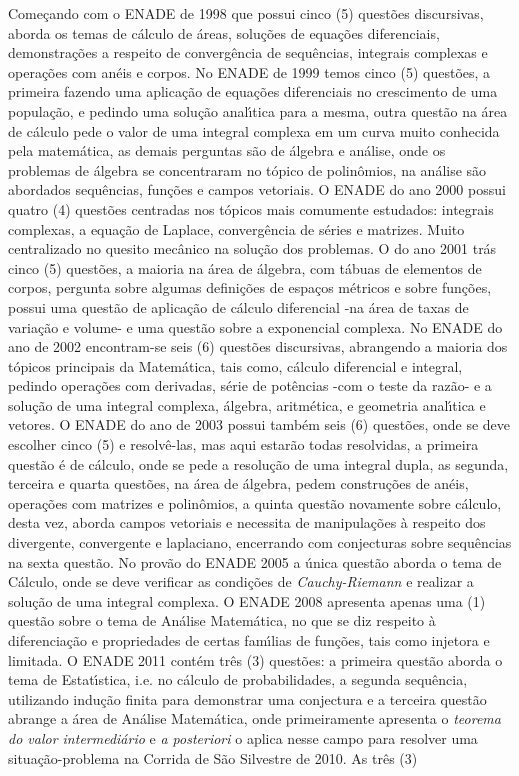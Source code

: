 \documentclass{report}
\begin{document}
Come\c cando com o ENADE de 1998 que possui cinco (5) quest\~oes discursivas, aborda os temas de c\'alculo de \'areas, solu\c c\~oes de equa\c c\~oes diferenciais, demonstra\c c\~oes a respeito de converg\^encia de sequ\^encias, integrais complexas e opera\c c\~oes com an\'eis e corpos. No ENADE de 1999 temos cinco (5) quest\~oes, a primeira fazendo uma aplica\c c\~ao de equa\c c\~oes diferenciais no crescimento de uma popula\c c\~ao, e pedindo uma solu\c c\~ao anal\'\i tica para a mesma, outra quest\~ao na \'area de c\'alculo pede o valor de uma integral complexa em um curva muito conhecida pela matem\'atica, as demais perguntas s\~ao de \'algebra e an\'alise, onde os problemas de \'algebra se concentraram no t\'opico de polinômios, na an\'alise s\~ao abordados sequ\^encias, fun\c c\~oes e campos vetoriais. O ENADE do ano 2000 possui quatro (4) quest\~oes centradas nos t\'opicos mais comumente estudados: integrais complexas, a equa\c c\~ao de Laplace, converg\^encia de s\'eries e matrizes. Muito centralizado no quesito mec\^anico na solu\c c\~ao dos problemas. O do ano 2001 tr\'as cinco (5) quest\~oes, a maioria na \'area de \'algebra, com t\'abuas de elementos de corpos, pergunta sobre algumas defini\c c\~oes de espa\c cos m\'etricos e sobre fun\c c\~oes, possui uma quest\~ao de aplica\c c\~ao de c\'alculo diferencial -na \'area de taxas de varia\c c\~ao e volume- e uma quest\~ao sobre a exponencial complexa. No ENADE do ano de 2002 encontram-se seis (6) quest\~oes discursivas, abrangendo a maioria dos t\'opicos principais da Matem\'atica, tais como, c\'alculo diferencial e integral, pedindo opera\c c\~oes com derivadas, s\'erie de pot\^encias -com o teste da raz\~ao- e a solu\c c\~ao de uma integral complexa, \'algebra, aritm\'etica, e geometria anal\'\i tica e vetores. O ENADE do ano de 2003 possui tamb\'em seis (6) quest\~oes, onde se deve escolher cinco (5) e resolv\^e-las, mas aqui estar\~ao todas resolvidas, a primeira quest\~ao \'e de c\'alculo, onde se pede a resolu\c c\~ao de uma integral dupla, as segunda, terceira e quarta quest\~oes, na \'area de \'algebra, pedem constru\c c\~oes de an\'eis, opera\c c\~oes com matrizes e polinômios, a quinta quest\~ao novamente sobre c\'alculo, desta vez, aborda campos vetoriais e necessita de manipula\c c\~oes \`a respeito dos divergente, convergente e laplaciano, encerrando com conjecturas sobre sequ\^encias na sexta quest\~ao. No prov\~ao do ENADE 2005 a \'unica quest\~ao aborda o tema de C\'alculo, onde se deve verificar as condi\c c\~oes de {\it Cauchy-Riemann} e realizar a solu\c c\~ao de uma integral complexa. O ENADE 2008 apresenta apenas uma (1) quest\~ao sobre o tema de An\'alise Matem\'atica, no que se diz respeito \`a diferencia\c c\~ao e propriedades de certas fam\'\i lias de fun\c c\~oes, tais como injetora e limitada. O ENADE 2011 cont\'em tr\^es (3) quest\~oes: a primeira quest\~ao aborda o tema de Estat\'\i stica, i.e. no c\'alculo de probabilidades, a segunda sequ\^encia, utilizando indu\c c\~ao finita para demonstrar uma conjectura e a terceira quest\~ao abrange a \'area de An\'alise Matem\'atica, onde primeiramente apresenta o {\it teorema do valor intermedi\'ario} e {\it a posteriori} o aplica nesse campo para resolver uma situa\c c\~ao-problema na Corrida de S\~ao Silvestre de 2010. As tr\^es (3) 
\end{document}
